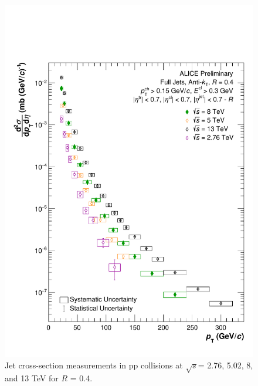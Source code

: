 \documentclass[ALICE]{ALICE_analysis_notes}
\newcommand{\s}{$\sqrt{s}$\xspace}
\newcommand{\pp}{pp\xspace}
\begin{document}
\begin{figure}[hbt!]
    \centering
    \includegraphics[width=\textwidth]{figures/EnergyComparisons/SpectrumComparison_R04.pdf}
    \caption{Jet cross-section measurements in \pp collisions at \s = 2.76, 5.02, 8, and 13 TeV for $R$ = 0.4.}
    \label{fig:specCompareR04}
\end{figure}
\end{document}
